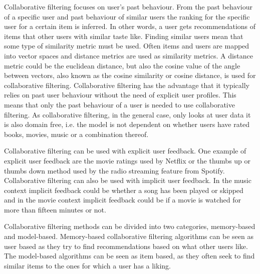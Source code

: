 \documentclass[a4paper,11pt]{kth-mag}
\begin{document}
 Collaborative filtering focuses on user's past behaviour. From the past behaviour of a specific user and past behaviour of similar users the ranking for the specific user for a certain item is inferred\cite{sarwar2001item}\cite{su2009survey}. In other words, a user gets recommendations of items that other users with similar taste like\cite{adomavicius2005toward}. Finding similar users mean that some type of similarity metric must be used. Often items and users are mapped into vector spaces and distance metrics are used as similarity metrics. A distance metric could be the euclidean distance, but also the cosine value of the angle between vectors, also known as the cosine similarity or cosine distance, is used for collaborative filtering\cite{sarwar2001item}. 
 Collaborative filtering has the advantage that it typically relies on past user behaviour without the need of explicit user profiles\cite{melville2002content}. This means that only the past behaviour of a user is needed to use collaborative filtering.  As collaborative filtering, in the general case, only looks at user data it is also domain free, i.e. the model is not dependent on whether users have rated books, movies, music or a combination thereof\cite{hu2008collaborative}.

Collaborative filtering can be used with explicit user feedback. One example of explicit user feedback are the movie ratings used by Netflix or the thumbs up or thumbs down method used by the radio streaming feature from Spotify. Collaborative filtering can also be used with implicit user feedback\cite{hu2008collaborative}. In the music context implicit feedback could be whether a song has been played or skipped and in the movie context implicit feedback could be if a movie is watched for more than fifteen minutes or not.

Collaborative filtering methods can be divided into two categories, memory-based and model-based. Memory-based collaborative filtering algorithms can be seen as user based as they try to find recommendations based on what other users like. The model-based algorithms can be seen as item based, as they often seek to find similar items to the ones for which a user has a liking\cite{sarwar2001item}.
\end{document}
